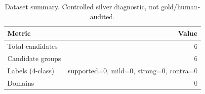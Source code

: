\begin{table}[ht]
\centering
\caption{Dataset summary. Controlled silver diagnostic, not gold/human-audited.}
\label{tab:dataset_summary}
\begin{tabular}{lr}
\toprule
Metric & Value \\
\midrule
Total candidates & 6 \\
Candidate groups & 6 \\
Labels (4-class) & supported=0, mild=0, strong=0, contra=0 \\
Domains & 0 \\
\bottomrule
\end{tabular}
\end{table}